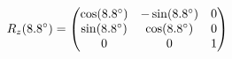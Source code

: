 \documentclass[preview]{standalone}
\begin{document}
\begin{align*}
\special{dvisvgm:raw <g id='unique000'>}R_z(8.8^\circ) = \begin{pmatrix} \cos(8.8^\circ) & -\sin(8.8^\circ) & 0 \\ \sin(8.8^\circ) & \cos(8.8^\circ) & 0 \\ 0 & 0 & 1 \end{pmatrix}\special{dvisvgm:raw </g>}
\end{align*}
\end{document}
